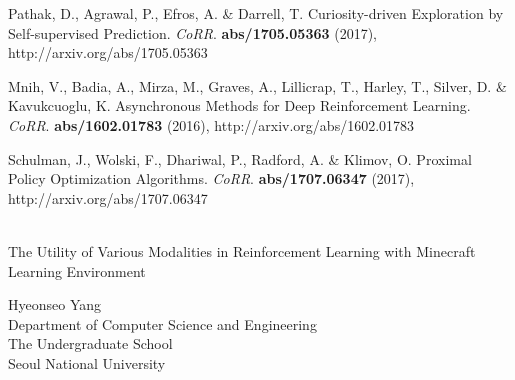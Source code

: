 \documentclass[oneside, under, ko]{snuthesis}
\begin{document}
\begin{thebibliography}{00}
    Pathak, D., Agrawal, P., Efros, A. \& Darrell, T. Curiosity-driven Exploration by Self-supervised Prediction. {\em CoRR}. \textbf{abs/1705.05363} (2017), http://arxiv.org/abs/1705.05363


    Mnih, V., Badia, A., Mirza, M., Graves, A., Lillicrap, T., Harley, T., Silver, D. \& Kavukcuoglu, K. Asynchronous Methods for Deep Reinforcement Learning. {\em CoRR}. \textbf{abs/1602.01783} (2016), http://arxiv.org/abs/1602.01783

    Schulman, J., Wolski, F., Dhariwal, P., Radford, A. \& Klimov, O. Proximal Policy Optimization Algorithms. {\em CoRR}. \textbf{abs/1707.06347} (2017), http://arxiv.org/abs/1707.06347


\end{thebibliography}



% 



\newpage
{}
\begin{center}
    \fontsize{16}{32}\selectfont
    \abstractnamealt\\
    \fontsize{22}{36}\selectfont
    The Utility of Various Modalities in Reinforcement Learning with Minecraft Learning Environment
    \vspace{1cm}
    \fontsize{14}{21}\selectfont
    \begin{flushright}
        Hyeonseo Yang\\
        Department of Computer Science and Engineering\\
        The Undergraduate School \\ 
        Seoul National University \\ 
    \end{flushright}
		
\end{center}
\end{document}
